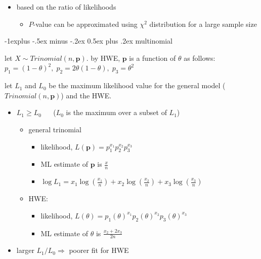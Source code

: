 \documentclass[10pt, landscape]{article}
\makeatletter
\renewcommand{\subsection}{\@startsection{subsection}{2}{0mm}%
  {-1explus -.5ex minus -.2ex}%
  {0.5ex plus .2ex}%
{\normalfont\normalsize\bfseries}}
\makeatother
\begin{document}
\begin{multicols*}{4}
  \begin{itemize}
    \item {} based on the ratio of likelihoods
      \begin{itemize}
        \item $P$-value can be approximated using $\chi^2$ distribution for a large sample size
      \end{itemize}
  \end{itemize}

  \subsection{multinomial}

  let $X \sim Trinomial(n, \mathbf{p})$. 
  by HWE, $\mathbf{p}$ is a function of $\theta$ as follows: $p_1 = (1-\theta)^2, \;p_2 = 2\theta(1-\theta), \; p_3 = \theta^2$

  let $L_1$ and $L_0$ be the maximum likelihood value for the general model ($Trinomial(n, \mathbf{p})$) and the HWE.

  \begin{itemize}
    \item $L_1 \geq L_0$ $\quad$ ($L_0$ is the maximum over a subset of $L_1$)
      \begin{itemize}
        \item general trinomial
          \begin{itemize}
            \item likelihood, $L(\mathbf{p}) = p_1^{x_1}p_2^{x_2}p_3^{x_3}$
            \item ML estimate of $\mathbf{p}$ is $\frac{x}{n}$
            \item $\log L_1 = x_1 \log (\frac{x_1}{n}) + x_2 \log (\frac{x_2}{n}) + x_3 \log (\frac{x_3}{n})$
          \end{itemize}
        \item HWE: 
          \begin{itemize}
            \item likelihood, $L(\theta) = p_1(\theta)^{x_1} p_2(\theta)^{x_2} p_3(\theta)^{x_3}$
            \item ML estimate of $\theta$ is $\frac{x_2 + 2x_3}{2n}$
          \end{itemize}
      \end{itemize}
    \item larger $L_1 / L_0 \Rightarrow$ poorer fit for HWE
  \end{itemize}


\end{multicols*}
\end{document}
